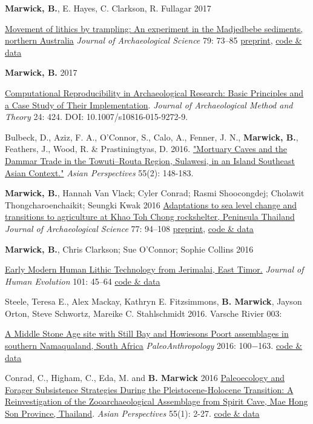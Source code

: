 \documentclass[11pt,article,oneside]{memoir}
\begin{document}
\ind  \textbf{Marwick, B.}, E. Hayes, C. Clarkson, R. Fullagar 2017 {\href{https://doi.org/10.1016/j.jas.2017.01.008}{Movement of lithics by trampling: An experiment in the Madjedbebe sediments, northern Australia} \textit{Journal of Archaeological Science}  79: 73–85 \href{https://doi.org/10.17605/OSF.IO/V2MS9}{preprint}, \href{https://doi.org/10.17605/OSF.IO/EDZXS}{code \& data}

\ind \textbf{Marwick, B.} 2017 {\href{http://dx.doi.org/10.1007/s10816-015-9272-9}{Computational Reproducibility in Archaeological Research: Basic Principles and a Case Study of Their Implementation}. \textit{Journal of Archaeological Method and Theory} 24: 424. DOI: 10.1007/s10816-015-9272-9.

\ind  Bulbeck, D., Aziz, F. A.,  O'Connor, S.,  Calo, A., Fenner, J. N., \textbf{Marwick, B.},  Feathers, J.,  Wood, R. \& Prastiningtyas, D. 2016. \href{http://dx.doi.org/10.1353/asi.2016.0017}{"Mortuary Caves and the Dammar Trade in the Towuti–Routa Region, Sulawesi, in an Island Southeast Asian Context."} \textit{Asian Perspectives} 55(2): 148-183.

\ind  \textbf{Marwick, B.}, Hannah Van Vlack; Cyler Conrad; Rasmi Shoocongdej; Cholawit Thongcharoenchaikit; Seungki Kwak 2016 \href{http://dx.doi.org/10.1016/j.jas.2016.10.010}{Adaptations to sea level change and transitions to agriculture at Khao Toh Chong rockshelter, Peninsula Thailand} \textit{Journal of Archaeological Science} 77: 94–108 \href{https://osf.io/preprints/socarxiv/axxf8/}{preprint}, \href{https://dx.doi.org/10.6084/m9.figshare.2065602}{code \& data}

\ind  \textbf{Marwick, B.}, Chris Clarkson; Sue O'Connor; Sophie Collins 2016 {\href{http://dx.doi.org/10.1016/j.jhevol.2016.09.004}{Early Modern Human Lithic Technology from Jerimalai, East Timor.} \textit{Journal of Human Evolution} 101: 45–64 \href{http://dx.doi.org/10.6084/m9.figshare.985406}{code \& data}

\ind Steele, Teresa E., Alex Mackay, Kathryn E. Fitzsimmons,  \textbf{B. Marwick}, Jayson Orton, Steve Schwortz, Mareike C. Stahlschmidt 2016. Varsche Rivier 003:  {\href{http://www.paleoanthro.org/media/journal/content/PA20160100.pdf}{A Middle Stone Age site with Still Bay and Howiesons Poort assemblages in southern Namaqualand, South Africa} \textit{PaleoAnthropology} 2016: 100−163. \href{https://github.com/benmarwick/Steele_et_al_VR003_MSA_Pigments}{code \& data}

\ind Conrad, C., Higham, C., Eda, M. and \textbf{B. Marwick} 2016 \href{https://doi.org/10.1353/asi.2016.0013}{Paleoecology and Forager Subsistence Strategies During the Pleistocene-Holocene Transition: A Reinvestigation of the Zooarchaeological Assemblage from Spirit Cave, Mae Hong Son Province, Thailand}. \textit{Asian Perspectives} 55(1): 2-27. \href{http://hdl.handle.net/1928/26730}{code \& data}

}}}}
\end{document}
